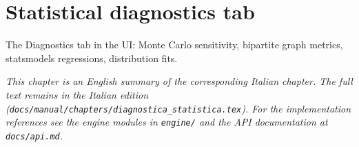 \chapter{Statistical diagnostics tab}
\label{ch:diagnostica_statistica_en}

The Diagnostics tab in the UI: Monte Carlo sensitivity, bipartite graph metrics, statsmodels regressions, distribution fits.

\medskip
\noindent
\textit{This chapter is an English summary of the corresponding Italian chapter. The full text remains in the Italian edition (\texttt{docs/manual/chapters/diagnostica\_statistica.tex}). For the implementation references see the engine modules in \texttt{engine/} and the API documentation at \texttt{docs/api.md}.}
